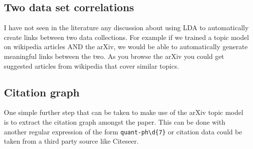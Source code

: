 \documentclass[letterpaper,11pt]{article}
\begin{document}

		


    \subsection{Two data set correlations}

        I have not seen in the literature any discussion about using LDA to automatically
        create links between two data collections.
        For example if we trained a topic model on wikipedia articles AND the arXiv,
        we would be able to automatically generate meaningful links between the two.
        As you browse the arXiv you could get suggested articles from wikipedia that cover similar topics.


			
    \subsection{Citation graph}

        One simple further step that can be taken to make use of the arXiv topic model 
        is to extract the citation graph amongst the paper. This can be done with another
        regular expression of the form \verb|quant-ph\d{7}| or citation data could be 
        taken from a third party source like Citeseer.
        
\end{document}
